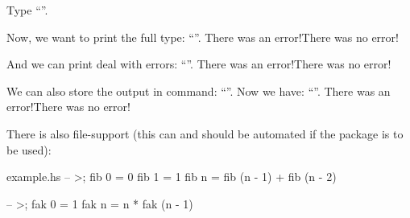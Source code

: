 \documentclass{article}
\def\errcheck{\ifhasktexlasterror There was an error!\else There was no error!\fi}
\begin{document}
Type ``''.

Now, we want to print the full type: ``''.
\errcheck

And we can print deal with errors: ``''.
\errcheck

We can also store the output in command: ``''. Now we have: ``\mycommand''.
\errcheck\medskip

There is also file-support (this can and should be automated if the package is to be used):
\begin{filecontents}{example.hs}
-- >;
fib 0 = 0
fib 1 = 1
fib n = fib (n - 1) + fib (n - 2)

-- >;
fak 0 = 1
fak n = n * fak (n - 1)
\end{filecontents}

\end{document}
